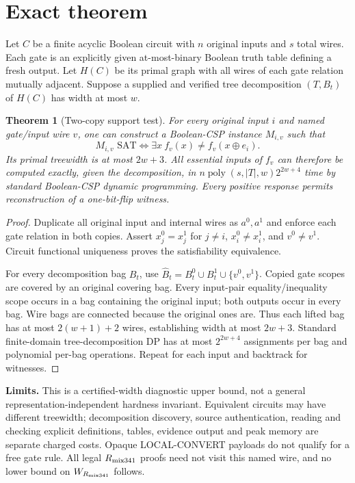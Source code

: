 \documentclass[11pt]{article}
\newtheorem{theorem}{Theorem}
\begin{document}
\section*{Exact theorem}
Let $C$ be a finite acyclic Boolean circuit with $n$ original inputs and $s$ total wires. Each gate is an explicitly given at-most-binary Boolean truth table defining a fresh output. Let $H(C)$ be its primal graph with all wires of each gate relation mutually adjacent. Suppose a supplied and verified tree decomposition $(T,B_t)$ of $H(C)$ has width at most $w$.
\begin{theorem}[Two-copy support test]
For every original input $i$ and named gate/input wire $v$, one can construct a Boolean-CSP instance $M_{i,v}$ such that
\[
M_{i,v}\text{ SAT}\iff\exists x\ f_v(x)\ne f_v(x\oplus e_i).
\]
Its primal treewidth is at most $2w+3$. All essential inputs of $f_v$ can therefore be computed exactly, given the decomposition, in $n\operatorname{poly}(s,|T|,w)2^{2w+4}$ time by standard Boolean-CSP dynamic programming. Every positive response permits reconstruction of a one-bit-flip witness.
\end{theorem}
\begin{proof}
Duplicate all original input and internal wires as $a^0,a^1$ and enforce each gate relation in both copies. Assert $x_j^0=x_j^1$ for $j\ne i$, $x_i^0\ne x_i^1$, and $v^0\ne v^1$. Circuit functional uniqueness proves the satisfiability equivalence.

For every decomposition bag $B_t$, use $\widehat B_t=B_t^0\cup B_t^1\cup\{v^0,v^1\}$. Copied gate scopes are covered by an original covering bag. Every input-pair equality/inequality scope occurs in a bag containing the original input; both outputs occur in every bag. Wire bags are connected because the original ones are. Thus each lifted bag has at most $2(w+1)+2$ wires, establishing width at most $2w+3$. Standard finite-domain tree-decomposition DP has at most $2^{2w+4}$ assignments per bag and polynomial per-bag operations. Repeat for each input and backtrack for witnesses.
\end{proof}
\noindent\textbf{Limits.} This is a certified-width diagnostic upper bound, not a general representation-independent hardness invariant. Equivalent circuits may have different treewidth; decomposition discovery, source authentication, reading and checking explicit definitions, tables, evidence output and peak memory are separate charged costs. Opaque LOCAL-CONVERT payloads do not qualify for a free gate rule. All legal $R_{\rm mix341}$ proofs need not visit this named wire, and no lower bound on $W_{R_{\rm mix341}}$ follows.
\end{document}
